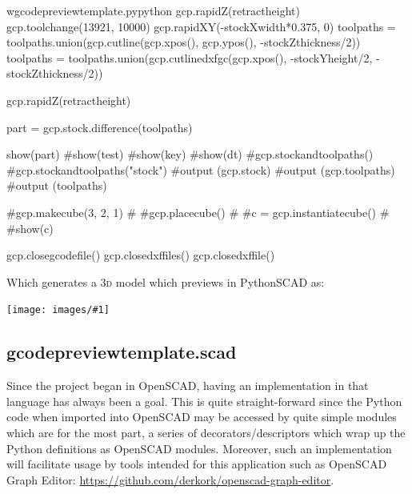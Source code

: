 \documentclass{ltxdoc}
\newcommand{\includeimage}[1]{\bigskip\noindent\texttt{[image: images/\#1]}\bigskip}
\begin{document}
\begin{writecode}{w}{gcodepreviewtemplate.py}{python}
gcp.rapidZ(retractheight)
gcp.toolchange(13921, 10000)
gcp.rapidXY(-stockXwidth*0.375, 0)
toolpaths = toolpaths.union(gcp.cutline(gcp.xpos(), gcp.ypos(), -stockZthickness/2))
toolpaths = toolpaths.union(gcp.cutlinedxfgc(gcp.xpos(), -stockYheight/2, -stockZthickness/2))

gcp.rapidZ(retractheight)

part = gcp.stock.difference(toolpaths)

show(part)
#show(test)
#show(key)
#show(dt)
#gcp.stockandtoolpaths()
#gcp.stockandtoolpaths("stock")
#output (gcp.stock)
#output (gcp.toolpaths)
#output (toolpaths)

#gcp.makecube(3, 2, 1)
#
#gcp.placecube()
#
#c = gcp.instantiatecube()
#
#show(c)

gcp.closegcodefile()
gcp.closedxffiles()
gcp.closedxffile()

\end{writecode}
\addtocounter{gcptmplpy}{328}

\begin{samepage}
\noindent Which generates a \textsc{3d} model which previews in PythonSCAD as:

\bigskip

\includeimage{gcodepreviewtemplate.png}
\end{samepage}

\subsection{gcodepreviewtemplate.scad}

Since the project began in OpenSCAD, having an implementation in that language has always been a goal. This is quite straight-forward since the Python code when imported into OpenSCAD may be accessed by quite simple modules which are for the most part, a series of decorators/descriptors which wrap up the Python definitions as OpenSCAD modules. Moreover, such an implementation will facilitate usage by tools intended for this application such as OpenSCAD Graph Editor: \url{https://github.com/derkork/openscad-graph-editor}. 
\end{document}
